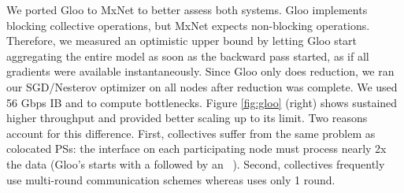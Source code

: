 We ported Gloo to MxNet to better assess both systems. Gloo implements blocking collective operations, but MxNet expects non-blocking operations. Therefore, we measured an optimistic upper bound by letting Gloo start aggregating the entire model as soon as the backward pass started, as if all gradients were available instantaneously. Since Gloo only does reduction, we ran our SGD/Nesterov optimizer on all nodes after reduction was complete. We used 56 Gbps IB and  to compute bottlenecks. Figure \ref{fig:gloo} (right) shows %
\pbox sustained higher throughput and provided better scaling up to its limit. Two reasons account for this difference. First, collectives suffer from the same problem as colocated PSs: the interface on each participating node must process nearly 2x the data (Gloo's  starts with a  followed by an ~\cite{Thakur:2005:OCC:2747766.2747771}). 
Second, collectives frequently use multi-round communication schemes %
whereas \pbox uses only 1 round. %





